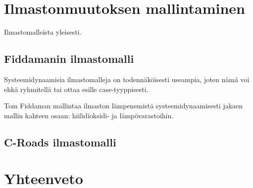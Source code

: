 \documentclass[finnish,12pt,a4paper,pdftex]{article}
\begin{document}
\begin{onehalfspacing}

\clearpage
\section{Ilmastonmuutoksen mallintaminen \label{ilmasto}}
Ilmastomalleista yleisesti.

\subsection{Fiddamanin ilmastomalli}
Systeemidynaamisia ilmastomalleja on todennäköisesti useampia, joten nämä voi ehkä ryhmitellä tai ottaa esille case-tyyppisesti. 

Tom Fiddaman mallintaa ilmaston lämpenemistä systeemidynaamisesti jakaen mallin kahteen osaan: hiilidioksidi- ja lämpövarastoihin. 

\subsection{C-Roads ilmastomalli}


\clearpage




\section{Yhteenveto}

\clearpage

{}



\end{onehalfspacing} %
\end{document}
